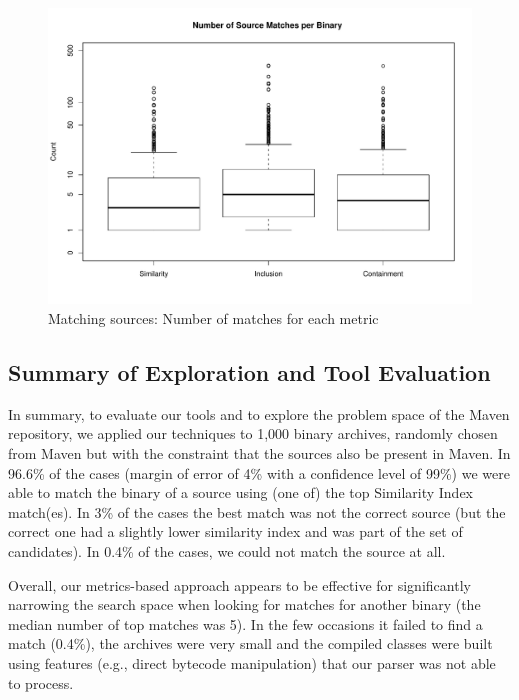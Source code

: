 \begin{figure}[h]
  \centering
\includegraphics[width=\columnwidth]{plots/boxplotAllMatches.pdf}
\vspace{-7mm}
  \caption{Matching sources: Number of matches for each metric}
  \label{fig:matchesMetric}
\end{figure}


\subsection{Summary of Exploration and Tool Evaluation}

In summary, to evaluate our tools and to explore the problem space
of the Maven repository, we applied our techniques to 1,000 binary
archives, randomly chosen from Maven but with the constraint that the
sources also be present in Maven.  In 96.6\% of the cases (margin of
error of 4\% with a confidence level of 99\%) we were able to match
the binary of a source using (one of) the top Similarity Index
match(es). In 3\% of the cases the best match was not the correct
source (but the correct one had a slightly lower similarity index and
was part of the set of candidates). In 0.4\% of the cases, we could not match
the source at all.

Overall, our metrics-based approach appears to be effective for
significantly narrowing the search space when looking for matches for
another binary (the median number of top matches was 5). In the few
occasions it failed to find a match (0.4\%), the archives were very small
and the compiled classes were built using features (e.g., direct bytecode
manipulation) that our parser was not able to process.

